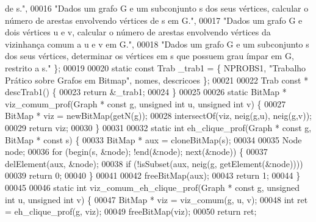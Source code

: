 \begin{DoxyCode}
{       de s."},
00016                                                                                         \textcolor{stringliteral}{"Dados um grafo G e
       um subconjunto s dos seus vértices, calcular o número de arestas envolvendo vértices de s em G."},
00017                                                                                         \textcolor{stringliteral}{"Dados um grafo G e
       dois vértices u e v, calcular o número de arestas envolvendo vértices da vizinhança comum a u e v em G."},
00018                                                                                         \textcolor{stringliteral}{"Dados um grafo G e
       um subconjunto s dos seus vértices, determinar os vértices em s que possuem grau ímpar em G, restrito a s."}
       \};
00019 
00020 \textcolor{keyword}{static} \textcolor{keyword}{const} Trab \_trab1 = \{ NPROBS1, \textcolor{stringliteral}{"Trabalho Prático sobre Grafos em Bitmap"}, nomes, descricoes \};
00021 
00022 Trab \textcolor{keyword}{const} * descTrab1() \{
00023         \textcolor{keywordflow}{return} &\_trab1;
00024 \}
00025 
00026 \textcolor{keyword}{static} BitMap * viz\_comum\_prof(Graph * \textcolor{keyword}{const} g, \textcolor{keywordtype}{unsigned} \textcolor{keywordtype}{int} u, \textcolor{keywordtype}{unsigned} \textcolor{keywordtype}{int} v) \{
00027         BitMap * viz = newBitMap(getN(g));
00028         intersectOf(viz, neig(g,u), neig(g,v));
00029         \textcolor{keywordflow}{return} viz;
00030 \}
00031 
00032 \textcolor{keyword}{static} \textcolor{keywordtype}{int} eh\_clique\_prof(Graph * \textcolor{keyword}{const} g, BitMap * \textcolor{keyword}{const} s) \{
00033         BitMap * aux = cloneBitMap(s);
00034 
00035         Node node;
00036         \textcolor{keywordflow}{for} (begin(s, &node); !end(&node); next(&node)) \{
00037                 delElement(aux, &node);
00038                 \textcolor{keywordflow}{if} (!isSubset(aux, neig(g, getElement(&node))))
00039                         \textcolor{keywordflow}{return} 0;
00040         \}
00041 
00042         freeBitMap(aux);
00043         \textcolor{keywordflow}{return} 1;
00044 \}
00045 
00046 \textcolor{keyword}{static} \textcolor{keywordtype}{int} viz\_comum\_eh\_clique\_prof(Graph * \textcolor{keyword}{const} g, \textcolor{keywordtype}{unsigned} \textcolor{keywordtype}{int} u, \textcolor{keywordtype}{unsigned} \textcolor{keywordtype}{int} v) \{
00047         BitMap * viz = viz_comum(g, u, v);
00048         \textcolor{keywordtype}{int} ret = eh\_clique\_prof(g, viz);
00049         freeBitMap(viz);
00050         \textcolor{keywordflow}{return} ret;

\end{DoxyCode}

